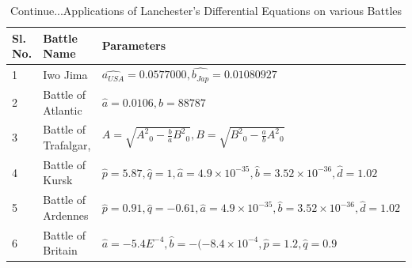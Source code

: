 \documentclass[]{article}
\begin{document}
\begin{table}
\tiny
\caption{Continue...Applications of Lanchester's Differential Equations on various Battles}

{\begin{tabular}{|p{0.1cm}|p{1.7cm}|p{5cm}|}\hline\hline
\tiny
\centering
Sl. No. & Battle Name	 & Parameters   \\
\hline
1& Iwo Jima\autocite{Rbloggers:2016}  & $\hat{a_{USA}}=0.0577000,\hat{b_{Jap}}=0.01080927 $\\
\hline
2&Battle of Atlantic\autocite{Washburn:2000}  &$\hat{a}=0.0106,\hat{b}=88787 $ \\\hline
3&Battle of Trafalgar\autocite{Kingman2002StochasticAO},\autocite{DanTeague} &  $A=\sqrt{{A^2}_0-\frac{b}{a}{B^2}_0},B=\sqrt{{B^2}_0-\frac{a}{b}{A^2}_0}$ \\\hline
4&Battle of Kursk\autocite{LukasTurkes:2004} &$\hat{p}=5.87,\hat{q}=1,\hat{a}=4.9\times10^{-35},\hat{b}=3.52\times10^{-36}, \hat{d}=1.02 $ \\\hline
5&Battle of Ardennes\autocite{Bracken:1995} &$\hat{p}=0.91,\hat{q}=-0.61,\hat{a}=4.9\times10^{-35},\hat{b}=3.52\times10^{-36}, \hat{d}=1.02 $ \\\hline
6&Battle of Britain\autocite{JohsonMackey:2011}  &$\hat{a}=-5.4E^{-4},\hat{b}=-(-8.4\times{10^{-4}},\hat{p}=1.2,\hat{q}=0.9$\\\hline
\end{tabular}}
\end{table}
\end{document}
